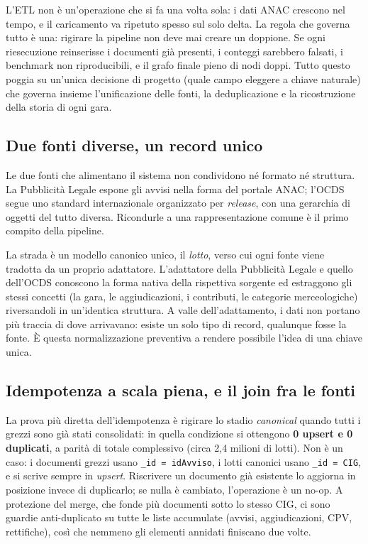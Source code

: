 \documentclass[11pt,a4paper]{article}
\begin{document}
L'ETL non è un'operazione che si fa una volta sola: i dati ANAC crescono nel tempo, e il
caricamento va ripetuto spesso sul solo delta. La regola che governa tutto è una: rigirare la
pipeline non deve mai creare un doppione. Se ogni riesecuzione reinserisse i documenti già
presenti, i conteggi sarebbero falsati, i benchmark non riproducibili, e il grafo finale pieno
di nodi doppi. Tutto questo poggia su un'unica decisione di progetto (quale campo eleggere a
chiave naturale) che governa insieme l'unificazione delle fonti, la deduplicazione e la
ricostruzione della storia di ogni gara.

\subsection{Due fonti diverse, un record unico}

Le due fonti che alimentano il sistema non condividono né formato né struttura. La Pubblicità
Legale espone gli avvisi nella forma del portale ANAC; l'OCDS segue uno standard
internazionale organizzato per \emph{release}, con una gerarchia di oggetti del tutto diversa.
Ricondurle a una rappresentazione comune è il primo compito della pipeline.

La strada è un modello canonico unico, il \emph{lotto}, verso cui ogni fonte viene tradotta da
un proprio adattatore. L'adattatore della Pubblicità Legale e quello dell'OCDS conoscono la
forma nativa della rispettiva sorgente ed estraggono gli stessi concetti (la gara, le
aggiudicazioni, i contributi, le categorie merceologiche) riversandoli in un'identica
struttura. A valle dell'adattamento, i dati non portano più traccia di dove arrivavano: esiste
un solo tipo di record, qualunque fosse la fonte. È questa normalizzazione preventiva a rendere
possibile l'idea di una chiave unica.

\subsection{Idempotenza a scala piena, e il join fra le fonti}

La prova più diretta dell'idempotenza è rigirare lo stadio \emph{canonical} quando tutti i
grezzi sono già stati consolidati: in quella condizione si ottengono \textbf{0 upsert e 0
duplicati}, a parità di totale complessivo (circa 2,4 milioni di lotti). Non è un caso: i
documenti grezzi usano \texttt{\_id\,=\,idAvviso}, i lotti canonici usano
\texttt{\_id\,=\,CIG}, e si scrive sempre in \emph{upsert}. Riscrivere un documento già
esistente lo aggiorna in posizione invece di duplicarlo; se nulla è cambiato, l'operazione è un
no-op. A protezione del merge, che fonde più documenti sotto lo stesso CIG, ci sono guardie
anti-duplicato su tutte le liste accumulate (avvisi, aggiudicazioni, CPV, rettifiche), così che
nemmeno gli elementi annidati finiscano due volte.
\end{document}
